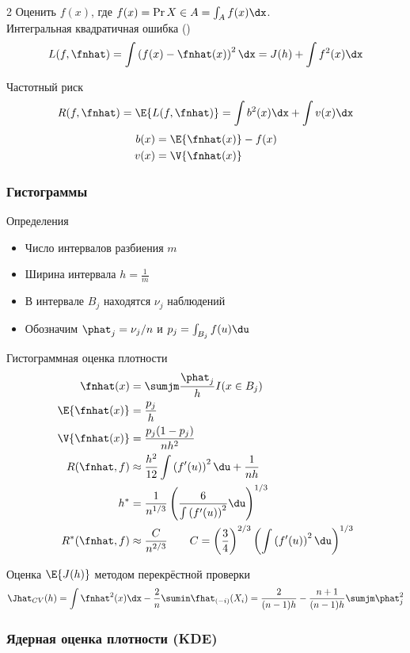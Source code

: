 \documentclass[landscape]{article}
\begin{document}
\begin{multicols*}{2}
Оценить $f(x)$, где $f(x) = \Pr{X \in A} = \int_A f(x)\dx$.\\

Интегральная квадратичная ошибка (\ise)
\[L(f, \fnhat) = \int\left(f(x) - \fnhat(x)\right)^2 \dx = J(h)+\int f^2(x)\dx\]

Частотный риск
\[R(f, \fnhat) = \E{L(f,\fnhat)} = \int b^2(x) \dx + \int v(x) \dx\]
\begin{align*}
  b(x) &= \E{\fnhat(x)} - f(x) \\
  v(x) &= \V{\fnhat(x)}
\end{align*}

\subsubsection{Гистограммы}

Определения
\begin{itemize}
  \item Число интервалов разбиения $m$
  \item Ширина интервала $h = \frac{1}{m}$
  \item В интервале $B_j$ находятся $\nu_j$ наблюдений
  \item Обозначим $\phat_j = \nu_j/n$ и $p_j = \int_{B_j} f(u)\du$
\end{itemize}

Гистограммная оценка плотности
\begin{align*}
\fnhat(x) &= \sumjm \frac{\phat_j}{h} I(x\in B_j) \\
\E{\fnhat(x)} &= \frac{p_j}{h} \\
\V{\fnhat(x)} &= \frac{p_j(1-p_j)}{nh^2} \\
R(\fnhat,f) &\approx
\frac{h^2}{12} \int \left(f'(u)\right)^2 \du + \frac{1}{nh} \\
h^* &= \frac{1}{n^{1/3}} \left( \frac{6}{\int\left(f'(u) \right)^2}\du
\right)^{1/3} \\
R^*(\fnhat,f) &\approx \frac{C}{n^{2/3}} \qquad
C = \left(\frac{3}{4}\right)^{2/3} \left( \int\left( f'(u) \right)^2 \du
\right)^{1/3}
\end{align*}

Оценка $\E{J(h)}$ методом перекрёстной проверки
\[\Jhat_{CV}(h)
= \int \fnhat^2(x) \dx - \frac{2}{n}\sumin \fhat_{(-i)}(X_i)
= \frac{2}{(n-1)h} - \frac{n+1}{(n-1)h} \sumjm \phat_j^2\]

\subsubsection{Ядерная оценка плотности (KDE)}


\end{multicols*}
\end{document}
